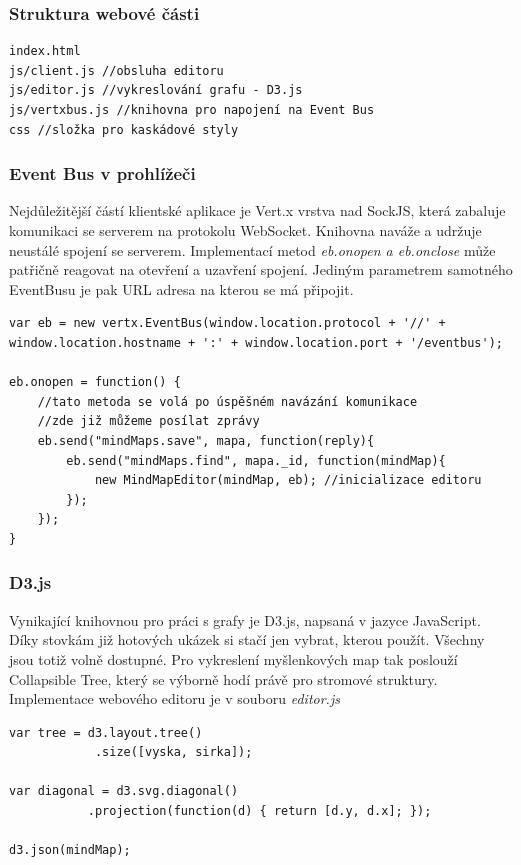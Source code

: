 \subsubsection{Struktura webové části}

\begin{lstlisting}
index.html
js/client.js //obsluha editoru
js/editor.js //vykreslování grafu - D3.js
js/vertxbus.js //knihovna pro napojení na Event Bus
css //složka pro kaskádové styly
\end{lstlisting}


\subsubsection{Event Bus v prohlížeči}

Nejdůležitější částí klientské aplikace je Vert.x vrstva nad SockJS\cite{sockjs}, která zabaluje komunikaci se serverem na protokolu WebSocket\cite{webSockets}. Knihovna naváže a udržuje neustálé spojení se serverem. Implementací metod \emph{eb.onopen a eb.onclose} může patřičně reagovat na otevření a uzavření spojení. Jediným parametrem samotného EventBusu je pak URL adresa na kterou se má připojit.

\begin{lstlisting}[caption=Připojení Event busu z prohlížeče a inicializace editoru]
var eb = new vertx.EventBus(window.location.protocol + '//' + window.location.hostname + ':' + window.location.port + '/eventbus');

eb.onopen = function() {
	//tato metoda se volá po úspěšném navázání komunikace
	//zde již můžeme posílat zprávy
	eb.send("mindMaps.save", mapa, function(reply){
		eb.send("mindMaps.find", mapa._id, function(mindMap){
			new MindMapEditor(mindMap, eb); //inicializace editoru
		});	
	});
}
\end{lstlisting}

\subsubsection{D3.js}

Vynikající knihovnou pro práci s grafy je D3.js, napsaná v jazyce JavaScript. Díky stovkám již hotových ukázek si stačí jen vybrat, kterou použít. Všechny jsou totiž volně dostupné. Pro vykreslení myšlenkových map tak poslouží Collapsible Tree\cite{d3js}, který se výborně hodí právě pro stromové struktury. Implementace webového editoru je v souboru \emph{editor.js}

\begin{lstlisting}[caption=D3.js nicializace dat]
var tree = d3.layout.tree()
		    .size([vyska, sirka]);

var diagonal = d3.svg.diagonal()
		   .projection(function(d) { return [d.y, d.x]; });
		   
d3.json(mindMap);
\end{lstlisting}


